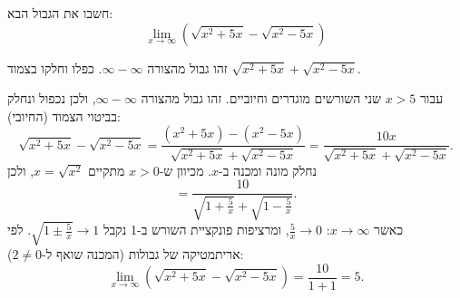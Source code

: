 
\begin{question}
חשבו את הגבול הבא:
\[
\lim_{x\to\infty}\left(\sqrt{x^2+5x}-\sqrt{x^2-5x}\right)
\]
\end{question}

\begin{hint}
זהו גבול מהצורה $\infty-\infty$. כפלו וחלקו בצמוד $\sqrt{x^2+5x}+\sqrt{x^2-5x}$.
\end{hint}

\begin{solution}
עבור $x>5$ שני השורשים מוגדרים וחיוביים. זהו גבול מהצורה $\infty-\infty$, ולכן נכפול ונחלק בביטוי הצמוד (החיובי):
\[
\sqrt{x^2+5x}-\sqrt{x^2-5x}
=\frac{(x^2+5x)-(x^2-5x)}{\sqrt{x^2+5x}+\sqrt{x^2-5x}}
=\frac{10x}{\sqrt{x^2+5x}+\sqrt{x^2-5x}} .
\]
נחלק מונה ומכנה ב-$x$. מכיוון ש-$x>0$ מתקיים $x=\sqrt{x^2}$, ולכן
\[
=\frac{10}{\sqrt{1+\frac5x}+\sqrt{1-\frac5x}} .
\]
כאשר $x\to\infty$: $\frac5x\to 0$, ומרציפות פונקציית השורש ב-1 נקבל $\sqrt{1\pm\frac5x}\to 1$. לפי אריתמטיקה של גבולות (המכנה שואף ל-$2\neq 0$):
\[
\lim_{x\to\infty}\left(\sqrt{x^2+5x}-\sqrt{x^2-5x}\right)=\frac{10}{1+1}=\boxed{5}.
\]
\end{solution}
